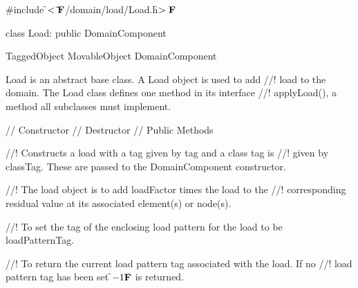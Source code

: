 
\indent \#include \f$<\tilde{ }{\bf F}$/domain/load/Load.h\f$>{\bf F}$

\indent class Load: public DomainComponent

\indent TaggedObject
\indent MovableObject
\indent\indent DomainComponent
\indent\indent{}

\indent Load is an abstract base class. A Load object is used to add
//! load to the domain. The Load class defines one method in its interface
//! applyLoad(), a method all subclasses must implement.


\indent // Constructor
\indent // Destructor
\indent // Public Methods

//! Constructs a load with a tag given by \p tag and a class tag is
//! given by \p classTag. These are passed to the DomainComponent constructor.


//! The load object is to add \p loadFactor times the load to the
//! corresponding residual value at its associated element(s) or node(s).

//! To set the tag of the enclosing load pattern for the load to be 
\p loadPatternTag.

//! To return the current load pattern tag associated with the load. If no
//! load pattern tag has been set \f$-1{\bf F}$ is returned.


